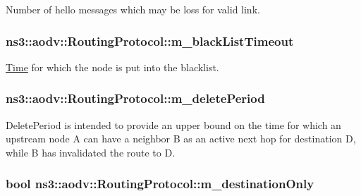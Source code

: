 Number of hello messages which may be loss for valid link. 

\subsubsection[{\texorpdfstring{m\+\_\+black\+List\+Timeout}{m_blackListTimeout}}]{ ns3\+::aodv\+::\+Routing\+Protocol\+::m\+\_\+black\+List\+Timeout\hspace{0.3cm}{\ttfamily [private]}}\hypertarget{classns3_1_1aodv_1_1RoutingProtocol_a23de7759e9c26ded382a09a860b4f987}{}\label{classns3_1_1aodv_1_1RoutingProtocol_a23de7759e9c26ded382a09a860b4f987}


\hyperlink{classns3_1_1Time}{Time} for which the node is put into the blacklist. 

\subsubsection[{\texorpdfstring{m\+\_\+delete\+Period}{m_deletePeriod}}]{ ns3\+::aodv\+::\+Routing\+Protocol\+::m\+\_\+delete\+Period\hspace{0.3cm}{\ttfamily [private]}}\hypertarget{classns3_1_1aodv_1_1RoutingProtocol_aa337fb24748eda19dda872f172e594a3}{}\label{classns3_1_1aodv_1_1RoutingProtocol_aa337fb24748eda19dda872f172e594a3}
Delete\+Period is intended to provide an upper bound on the time for which an upstream node A can have a neighbor B as an active next hop for destination D, while B has invalidated the route to D. 
\subsubsection[{\texorpdfstring{m\+\_\+destination\+Only}{m_destinationOnly}}]{\setlength{\rightskip}{0pt plus 5cm}bool ns3\+::aodv\+::\+Routing\+Protocol\+::m\+\_\+destination\+Only\hspace{0.3cm}{\ttfamily [private]}}\hypertarget{classns3_1_1aodv_1_1RoutingProtocol_aad49f5618b2843a1ae43a9c50aabc54f}{}\label{classns3_1_1aodv_1_1RoutingProtocol_aad49f5618b2843a1ae43a9c50aabc54f}


